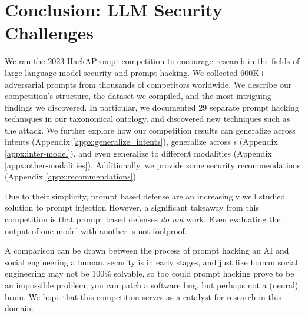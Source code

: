 \section{Conclusion: LLM Security Challenges}
\label{sec:conclusion}


We ran the 2023 HackAPrompt competition to encourage research in the fields of large language model security and prompt hacking. We collected 600K+ adversarial prompts from thousands of competitors worldwide. We describe our competition's structure, the dataset we compiled, and the most intriguing findings we discovered. In particular, we documented 29 separate prompt hacking techniques in our taxonomical ontology, and discovered new techniques such as the \context{} attack. We further explore how our competition results can generalize across intents (Appendix \ref{appx:generalize_intents}), generalize across \llm{}s (Appendix \ref{appx:inter-model}), and even generalize to different modalities (Appendix \ref{appx:other-modalities}). 
Additionally, we provide some security recommendations (Appendix \ref{appx:recommendations})

Due to their simplicity, prompt based defense are an increasingly well studied solution to prompt injection \cite{fangzhao2023defending, Schulhoff_Learn_Prompting_2022}
However, a significant takeaway from this competition is that prompt based defenses \emph{do not} work. Even evaluating the output of one model with another is not foolproof. 

A comparison can be drawn between the process of prompt hacking an AI and social engineering a human.
\llm{} security is in early stages, and just like human social engineering may not be 100\% solvable, so too could prompt hacking prove to be an impossible problem; you can patch a software bug, but perhaps not a (neural) brain. We hope that this competition serves as a catalyst for research in this domain. 






